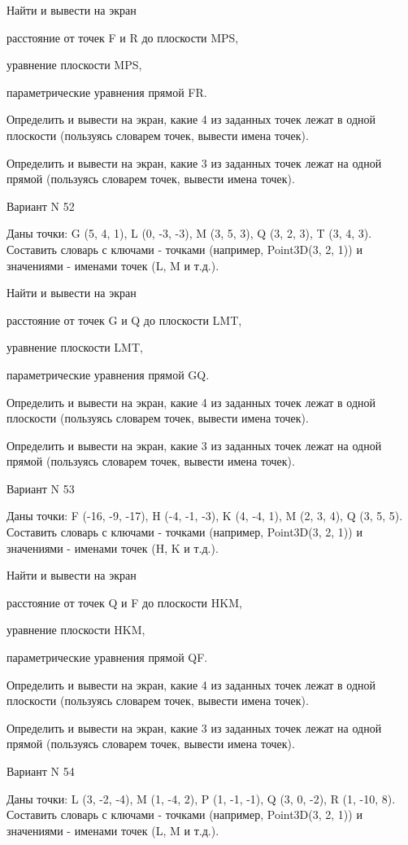 \documentclass[11pt]{report}
\begin{document}
 
Найти и вывести на экран


расстояние от точек F и R до плоскости MPS,

 
уравнение плоскости MPS,

 
параметрические уравнения прямой FR.


Определить и вывести на экран, какие 4 из заданных точек лежат в одной плоскости (пользуясь словарем точек, вывести имена точек).


Определить и вывести на экран, какие 3 из заданных точек лежат на одной прямой (пользуясь словарем точек, вывести имена точек).

Вариант N 52

Даны точки: G (5, 4, 1), L (0, -3, -3), M (3, 5, 3), Q (3, 2, 3), T (3, 4, 3).
Составить словарь с ключами - точками (например, Point3D(3, 2, 1)) и значениями - именами точек (L, M и т.д.).

 
Найти и вывести на экран


расстояние от точек G и Q до плоскости LMT,

 
уравнение плоскости LMT,

 
параметрические уравнения прямой GQ.


Определить и вывести на экран, какие 4 из заданных точек лежат в одной плоскости (пользуясь словарем точек, вывести имена точек).


Определить и вывести на экран, какие 3 из заданных точек лежат на одной прямой (пользуясь словарем точек, вывести имена точек).

Вариант N 53

Даны точки: F (-16, -9, -17), H (-4, -1, -3), K (4, -4, 1), M (2, 3, 4), Q (3, 5, 5).
Составить словарь с ключами - точками (например, Point3D(3, 2, 1)) и значениями - именами точек (H, K и т.д.).

 
Найти и вывести на экран


расстояние от точек Q и F до плоскости HKM,

 
уравнение плоскости HKM,

 
параметрические уравнения прямой QF.


Определить и вывести на экран, какие 4 из заданных точек лежат в одной плоскости (пользуясь словарем точек, вывести имена точек).


Определить и вывести на экран, какие 3 из заданных точек лежат на одной прямой (пользуясь словарем точек, вывести имена точек).

Вариант N 54

Даны точки: L (3, -2, -4), M (1, -4, 2), P (1, -1, -1), Q (3, 0, -2), R (1, -10, 8).
Составить словарь с ключами - точками (например, Point3D(3, 2, 1)) и значениями - именами точек (L, M и т.д.).
\end{document}

